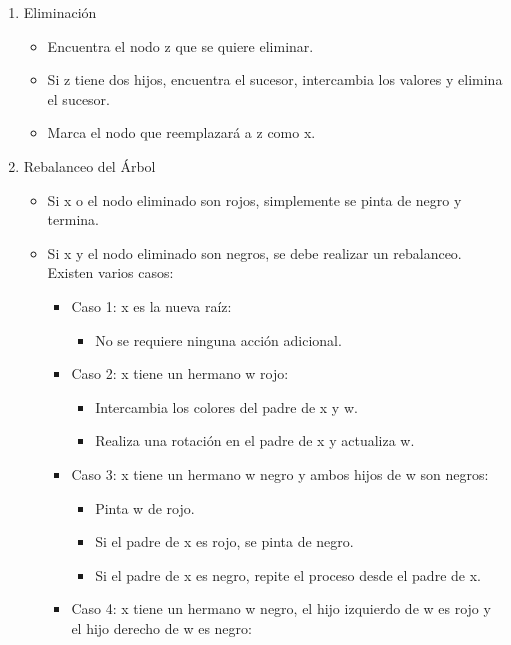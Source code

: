 \documentclass[12pt]{article}
\begin{document}
\begin{enumerate}
    \item Eliminación
    \begin{itemize}
        \item Encuentra el nodo z que se quiere eliminar.
        \item Si z tiene dos hijos, encuentra el sucesor, intercambia los valores y elimina el sucesor.
        \item Marca el nodo que reemplazará a z como x.
    \end{itemize}
    \item Rebalanceo del Árbol
    \begin{itemize}
        \item Si x o el nodo eliminado son rojos, simplemente se pinta de negro y termina.
        \item Si x y el nodo eliminado son negros, se debe realizar un rebalanceo. Existen varios casos:
        \begin{itemize}
            \item Caso 1: x es la nueva raíz:
            \begin{itemize}
                \item No se requiere ninguna acción adicional.
            \end{itemize}
            \item Caso 2: x tiene un hermano w rojo:
            \begin{itemize}
                \item Intercambia los colores del padre de x y w.
                \item Realiza una rotación en el padre de x y actualiza w.
            \end{itemize}
            \item Caso 3: x tiene un hermano w negro y ambos hijos de w son negros:
            \begin{itemize}
                \item Pinta w de rojo.
                \item Si el padre de x es rojo, se pinta de negro.
                \item Si el padre de x es negro, repite el proceso desde el padre de x.
            \end{itemize}
            \item Caso 4: x tiene un hermano w negro, el hijo izquierdo de w es rojo y el hijo derecho de w es negro:
            \begin{itemize}

\end{itemize}
\end{itemize}
\end{itemize}
\end{enumerate}
\end{document}
